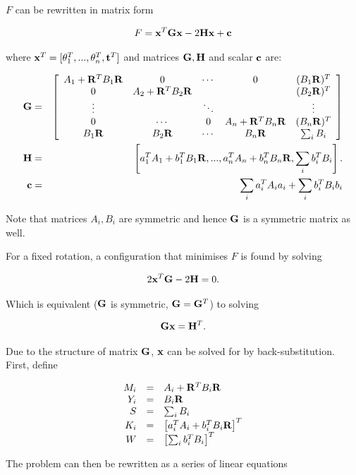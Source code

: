 $F$ can be rewritten in matrix form

$$
F =  {\bf x}^T{\bf Gx} -2{\bf Hx} + {\bf c}
$$

where ${\bf x}^T = [\theta_1^T,...,\theta_n^T, {\bf t}^T]$ and
matrices ${\bf G},{\bf H}$ and scalar ${\bf c}$ are:

\begin{eqnarray}
{\bf G} &=& \left[ \begin{array}{ccccc}
A_1 + {\bf R}^TB_1{\bf R}&
0&\cdots&0&
(B_1{\bf R})^T\\
0&A_2 + {\bf R}^TB_2{\bf R}&&&(B_2{\bf R})^T\\
\vdots & & \ddots & & \vdots\\
0&\cdots&0&
A_n + {\bf R}^TB_n{\bf R}&
(B_n{\bf R})^T\\
B_1{\bf R}&B_2{\bf R}&\cdots&
B_n{\bf R}&
\sum_i B_i
\end{array} \right]\\
{\bf H}  &=& \left[a_1^TA_1+b_1^TB_1{\bf  R},...,
a_n^TA_n+b_n^TB_n{\bf R},
\sum_i b_i^TB_i
 \right].\\
{\bf c} &=& \sum_i a_i^TA_ia_i + \sum_i b_i^TB_ib_i
\end{eqnarray}

Note that matrices $A_i,B_i$ are symmetric and hence ${\bf G}$ is a
symmetric matrix as well.

For a fixed rotation, a configuration that minimises $F$ is found by
solving

$$
2{\bf x}^T{\bf G} - 2{\bf H} = 0.
$$

Which is equivalent (${\bf G}$ is symmetric, ${\bf G} = {\bf G}^T$) to
solving

$$
 {\bf Gx} = {\bf H}^T.
$$

Due to the structure of matrix ${\bf G}$, ${\bf x}$ can be solved for
by back-substitution. First, define

\begin{equation}
\begin{array}{rcl}
M_i &=& A_i + {\bf R}^TB_i{\bf R}\\
Y_i &=& B_i{\bf R}\\
S   &=& \sum_i B_i \\
K_i &=& \left[a_i^TA_i + b_i^TB_i{\bf R}\right]^T\\
W   &=& \left[ \sum_i b_i^TB_i \right]^T
\end{array}
\end{equation}

The problem can then be rewritten as a series of linear equations

